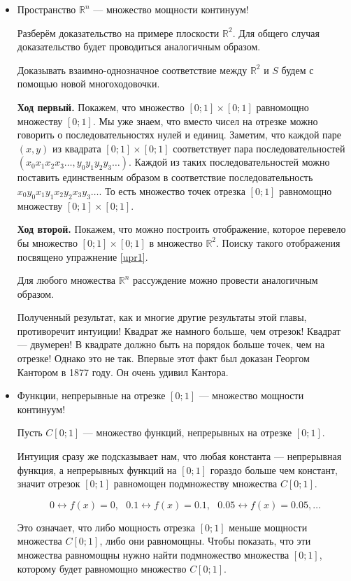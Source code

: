 \documentclass[pdftex, 12pt, a4paper]{article}
\def \mbb{\mathbb}
\def \RR{\mbb R}
\theoremstyle{definition} %
\numberwithin{problem}{section}
\numberwithin{blits}{section}
\begin{document}
\begin{itemize}
\begin{itemize}
\item Пространство $\RR^{n}$ --- множество мощности континуум!

Разберём доказательство на примере плоскости $\RR^2$. Для общего случая доказательство будет проводиться аналогичным образом.

Доказывать взаимно-однозначное соответствие между $\RR^2$ и $S$ будем с помощью новой многоходовочки.

\textbf{Ход первый.} Покажем, что множество $[0;1] \times [0;1]$ равномощно множеству $[0;1]$. Мы уже знаем, что вместо чисел на отрезке можно говорить о последовательностях нулей и единиц. Заметим, что каждой паре $(x,y)$ из квадрата $[0;1] \times [0;1]$ соответствует пара последовательностей $(x_0 x_1 x_2 x_3 \dots, y_0 y_1 y_2 y_3 \dots)$. Каждой из таких последовательностей можно поставить единственным образом в соответствие последовательность $x_0 y_0 x_1 y_1 x_2 y_2 x_3 y_3 \dots$. То есть множество точек отрезка  $[0;1]$ равномощно множеству $[0;1] \times [0;1]$.

\textbf{Ход второй.} Покажем, что можно построить отображение, которое перевело бы множество $[0;1] \times [0;1]$ в множество $\RR^{2}$. Поиску такого отображения посвящено упражнение \ref{upr1}.

Для любого множества $\RR^n$ рассуждение можно провести аналогичным образом.

Полученный результат, как и многие другие результаты этой главы, противоречит интуиции! Квадрат же намного больше, чем отрезок! Квадрат --- двумерен! В квадрате должно быть на порядок больше точек, чем на отрезке! Однако это не так. Впервые этот факт был доказан Георгом Кантором в 1877 году. Он очень удивил Кантора.

\item Функции, непрерывные на отрезке  $[0;1]$ --- множество мощности континуум!  \label{upr3}

Пусть $C[0;1]$ --- множество функций, непрерывных на отрезке $[0;1]$.

Интуиция сразу же подсказывает нам, что любая константа --- непрерывная функция, а непрерывных  функций на $[0;1]$ гораздо больше чем констант, значит отрезок $[0;1]$ равномощен подмножеству множества $C[0;1]$.

\[0 \leftrightarrow f(x) = 0, \mbox{ } 0.1 \leftrightarrow f(x) = 0.1, \mbox{ } 0.05 \leftrightarrow f(x) = 0.05, \dots \]

Это означает, что либо мощность отрезка $[0;1]$ меньше мощности множества $C[0;1]$, либо они равномощны.
Чтобы показать, что эти множества равномощны нужно найти подмножество множества $[0;1]$, которому будет равномощно множество $C[0;1]$.


\end{itemize}
\end{itemize}
\end{document}
